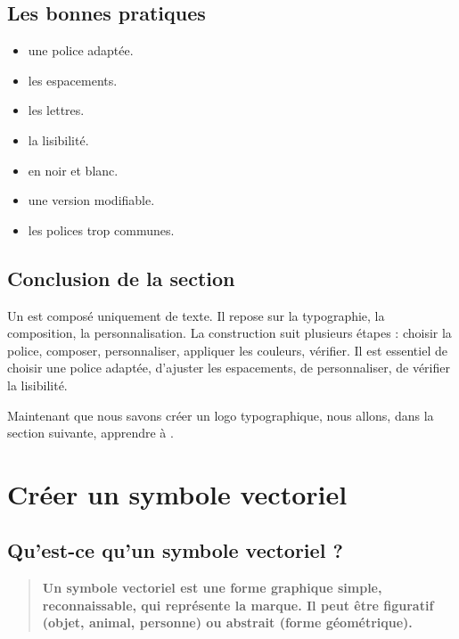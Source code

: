 \subsection{Les bonnes pratiques}

\begin{itemize}
    \item {} une police adaptée.
    \item {} les espacements.
    \item {} les lettres.
    \item {} la lisibilité.
    \item {} en noir et blanc.
    \item {} une version modifiable.
    \item {} les polices trop communes.
\end{itemize}

\subsection*{Conclusion de la section}

Un  est composé uniquement de texte. Il repose sur la typographie, la composition, la personnalisation. La construction suit plusieurs étapes : choisir la police, composer, personnaliser, appliquer les couleurs, vérifier. Il est essentiel de choisir une police adaptée, d'ajuster les espacements, de personnaliser, de vérifier la lisibilité.

Maintenant que nous savons créer un logo typographique, nous allons, dans la section suivante, apprendre à .

\section{Créer un symbole vectoriel}

\subsection{Qu'est-ce qu'un symbole vectoriel ?}

\begin{quote}
\textbf{Un symbole vectoriel est une forme graphique simple, reconnaissable, qui représente la marque. Il peut être figuratif (objet, animal, personne) ou abstrait (forme géométrique).}
\end{quote}

